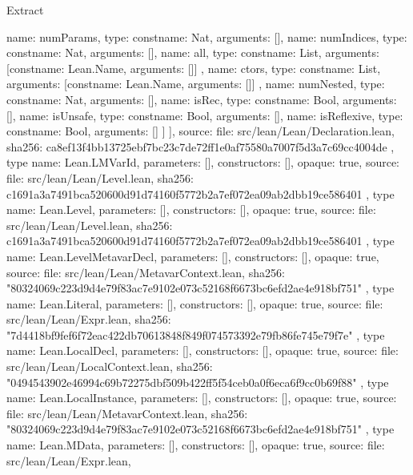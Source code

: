 \begin{lexlean}{Extract}
\begin{toolingmodule}
{{{            {name: numParams, type: const{name: Nat, arguments: []}},
            {name: numIndices, type: const{name: Nat, arguments: []}},
            {
              name: all,
              type: const{name: List, arguments: [const{name: Lean.Name, arguments: []}]}
            },
            {
              name: ctors,
              type: const{name: List, arguments: [const{name: Lean.Name, arguments: []}]}
            },
            {name: numNested, type: const{name: Nat, arguments: []}},
            {name: isRec, type: const{name: Bool, arguments: []}},
            {name: isUnsafe, type: const{name: Bool, arguments: []}},
            {name: isReflexive, type: const{name: Bool, arguments: []}}
          ]
        }
      ],
      source: {
        file: src/lean/Lean/Declaration.lean,
        sha256: ca8ef13f4bb13725ebf7bc23c7de72ff1e0af75580a7007f5d3a7c69cc4004de
      }
    },
    type{
      name: Lean.LMVarId,
      parameters: [],
      constructors: [],
      opaque: true,
      source: {
        file: src/lean/Lean/Level.lean,
        sha256: c1691a3a7491bca520600d91d74160f5772b2a7ef072ea09ab2dbb19ce586401
      }
    },
    type{
      name: Lean.Level,
      parameters: [],
      constructors: [],
      opaque: true,
      source: {
        file: src/lean/Lean/Level.lean,
        sha256: c1691a3a7491bca520600d91d74160f5772b2a7ef072ea09ab2dbb19ce586401
      }
    },
    type{
      name: Lean.LevelMetavarDecl,
      parameters: [],
      constructors: [],
      opaque: true,
      source: {
        file: src/lean/Lean/MetavarContext.lean,
        sha256: "80324069c223d9d4e79f83ac7e9102e073c52168f6673bc6efd2ae4e918bf751"
      }
    },
    type{
      name: Lean.Literal,
      parameters: [],
      constructors: [],
      opaque: true,
      source: {
        file: src/lean/Lean/Expr.lean,
        sha256: "7d4418bf9fef6f72eac422db70613848f849f074573392e79fb86fe745e79f7e"
      }
    },
    type{
      name: Lean.LocalDecl,
      parameters: [],
      constructors: [],
      opaque: true,
      source: {
        file: src/lean/Lean/LocalContext.lean,
        sha256: "0494543902e46994c69b72275dbf509b422ff5f54ceb0a0f6eca6f9cc0b69f88"
      }
    },
    type{
      name: Lean.LocalInstance,
      parameters: [],
      constructors: [],
      opaque: true,
      source: {
        file: src/lean/Lean/MetavarContext.lean,
        sha256: "80324069c223d9d4e79f83ac7e9102e073c52168f6673bc6efd2ae4e918bf751"
      }
    },
    type{
      name: Lean.MData,
      parameters: [],
      constructors: [],
      opaque: true,
      source: {
        file: src/lean/Lean/Expr.lean,
}}}
\end{toolingmodule}
\end{lexlean}

